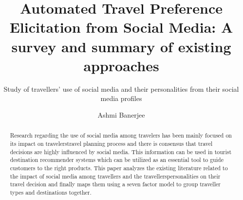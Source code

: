\documentclass[sigconf]{acmart}
\begin{document}
\title{Automated Travel Preference Elicitation from Social Media: A survey and summary of existing approaches}
\subtitle{Study of travellers' use of social media and their personalities from their social media profiles}

\author{Ashmi Banerjee}

\renewcommand{\shortauthors}{Ashmi Banerjee}


\begin{abstract}
Research regarding the use of social media among travelers has been mainly focused on its impact on travelers\textquotesingle travel planning process and there is consensus that travel decisions are highly influenced by social media. This information can be used in tourist destination recommender systems which can be utilized as an essential tool to guide customers to the right products. This paper analyzes the existing literature related to the impact of social media among travellers and the travellers\textquotesingle personalities on their travel decision and finally maps them using a seven factor model to group traveller types and destinations together.


\end{abstract}


\maketitle






\end{document}
